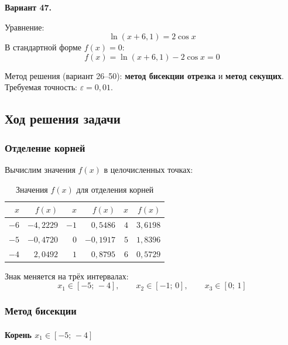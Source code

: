 \documentclass[a4paper,12pt]{article}
\begin{document}
\textbf{Вариант 47.}

Уравнение:
\[
\ln(x + 6{,}1) = 2\cos x
\]
В стандартной форме $f(x) = 0$:
\[
f(x) = \ln(x + 6{,}1) - 2\cos x = 0
\]

Метод решения (вариант 26--50): \textbf{метод бисекции отрезка} и \textbf{метод секущих}.
Требуемая точность: $\varepsilon = 0{,}01$.

\subsection{Ход решения задачи}

\subsubsection{Отделение корней}

Вычислим значения $f(x)$ в целочисленных точках:

\begin{table}[H]
\centering
\caption{Значения $f(x)$ для отделения корней}
\begin{tabular}{rr|rr|rr}
\toprule
$x$ & $f(x)$ & $x$ & $f(x)$ & $x$ & $f(x)$ \\
\midrule
$-6$ & $-4{,}2229$ & $-1$ & $0{,}5486$ & $4$ & $3{,}6198$ \\
$-5$ & $-0{,}4720$ & $0$  & $-0{,}1917$ & $5$ & $1{,}8396$ \\
$-4$ & $2{,}0492$  & $1$  & $0{,}8795$ & $6$ & $0{,}5729$ \\
\bottomrule
\end{tabular}
\end{table}

Знак меняется на трёх интервалах:
\[
x_1 \in [-5;\,-4], \qquad x_2 \in [-1;\,0], \qquad x_3 \in [0;\,1]
\]

\subsubsection{Метод бисекции}

\paragraph{Корень $x_1 \in [-5;\,-4]$}
\end{document}

